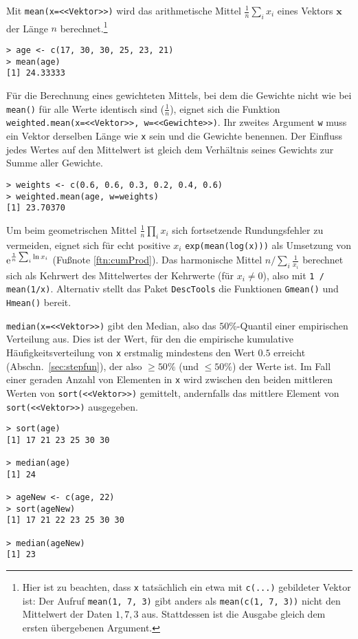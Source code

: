 Mit \lstinline!mean(x=<<Vektor>>)! wird das arithmetische Mittel $\frac{1}{n} \sum_{i}{x_{i}}$ eines Vektors $\bm{x}$ der Länge $n$ berechnet.\footnote{Hier ist zu beachten, dass \lstinline!x! tatsächlich ein etwa mit \lstinline!c(...)! gebildeter Vektor ist: Der Aufruf \lstinline!mean(1, 7, 3)! gibt anders als \lstinline!mean(c(1, 7, 3))! nicht den Mittelwert der Daten $1, 7, 3$ aus. Stattdessen ist die Ausgabe gleich dem ersten übergebenen Argument.}
\begin{lstlisting}
> age <- c(17, 30, 30, 25, 23, 21)
> mean(age)
[1] 24.33333
\end{lstlisting}

Für die Berechnung eines gewichteten Mittels, bei dem die Gewichte nicht wie bei \lstinline!mean()! für alle Werte identisch sind ($\frac{1}{n}$), eignet sich die Funktion \lstinline!weighted.mean(x=<<Vektor>>, w=<<Gewichte>>)!. Ihr zweites Argument \lstinline!w! muss ein Vektor derselben Länge wie \lstinline!x! sein und die Gewichte benennen. Der Einfluss jedes Wertes auf den Mittelwert ist gleich dem Verhältnis seines Gewichts zur Summe aller Gewichte.
\begin{lstlisting}
> weights <- c(0.6, 0.6, 0.3, 0.2, 0.4, 0.6)
> weighted.mean(age, w=weights)
[1] 23.70370
\end{lstlisting}

Um beim geometrischen Mittel $\frac{1}{n} \prod_{i}{x_{i}}$ sich fortsetzende Rundungsfehler zu vermeiden, eignet sich für echt positive $x_{i}$ \lstinline!exp(mean(log(x)))! als Umsetzung von ${\mathrm{e}}^{\frac{1}{n} \sum_{i}{\ln x_{i}}}$ (Fußnote \ref{ftn:cumProd}). Das harmonische Mittel $n / \sum_{i}{\frac{1}{x_{i}}}$ berechnet sich als Kehrwert des Mittelwertes der Kehrwerte (für $x_{i} \neq 0$), also mit \lstinline!1 / mean(1/x)!. Alternativ stellt das Paket \lstinline!DescTools! die Funktionen \lstinline!Gmean()! und \lstinline!Hmean()! bereit.

\lstinline!median(x=<<Vektor>>)! gibt den Median, also das $50\%$-Quantil einer empirischen Verteilung aus. Dies ist der Wert, für den die empirische kumulative Häufigkeitsverteilung von \lstinline!x! erstmalig mindestens den Wert $0.5$ erreicht (Abschn.\ \ref{sec:stepfun}), der also $\geq 50\%$ (und $\leq 50\%$) der Werte ist. Im Fall einer geraden Anzahl von Elementen in \lstinline!x! wird zwischen den beiden mittleren Werten von \lstinline!sort(<<Vektor>>)! gemittelt, andernfalls das mittlere Element von \lstinline!sort(<<Vektor>>)! ausgegeben.
\begin{lstlisting}
> sort(age)
[1] 17 21 23 25 30 30

> median(age)
[1] 24

> ageNew <- c(age, 22)
> sort(ageNew)
[1] 17 21 22 23 25 30 30

> median(ageNew)
[1] 23
\end{lstlisting}

